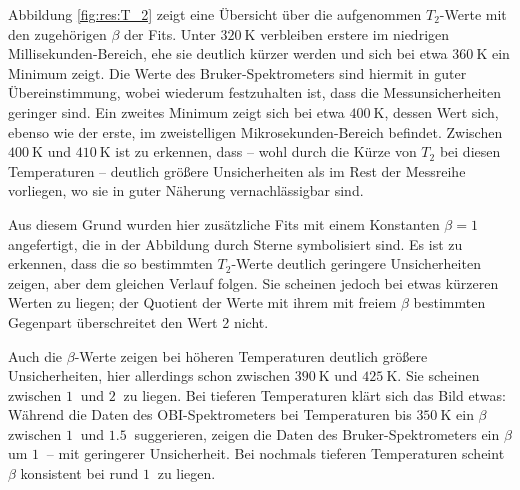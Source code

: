 Abbildung \ref{fig:res:T_2} zeigt eine Übersicht über die aufgenommen $T_2$-Werte mit den zugehörigen $\beta$ der Fits. Unter $\SI{320}{\kelvin}$ verbleiben erstere im niedrigen Millisekunden-Bereich, ehe sie deutlich kürzer werden und sich bei etwa $\SI{360}{\kelvin}$ ein Minimum zeigt. Die Werte des Bruker-Spektrometers sind hiermit in guter Übereinstimmung, wobei wiederum festzuhalten ist, dass die Messunsicherheiten geringer sind. Ein zweites Minimum zeigt sich bei etwa $\SI{400}{\kelvin}$, dessen Wert sich, ebenso wie der erste, im zweistelligen Mikrosekunden-Bereich befindet. Zwischen $\SI{400}{\kelvin}$ und $\SI{410}{\kelvin}$ ist zu erkennen, dass -- wohl durch die Kürze von $T_2$ bei diesen Temperaturen -- deutlich größere Unsicherheiten als im Rest der Messreihe vorliegen, wo sie in guter Näherung vernachlässigbar sind.

Aus diesem Grund wurden hier zusätzliche Fits mit einem Konstanten $\beta = 1$ angefertigt, die in der Abbildung durch Sterne symbolisiert sind. Es ist zu erkennen, dass die so bestimmten $T_2$-Werte deutlich geringere Unsicherheiten zeigen, aber dem gleichen Verlauf folgen. Sie scheinen jedoch bei etwas kürzeren Werten zu liegen; der Quotient der Werte mit ihrem mit freiem $\beta$ bestimmten Gegenpart überschreitet den Wert 2 nicht.

Auch die $\beta$-Werte zeigen bei höheren Temperaturen deutlich größere Unsicherheiten, hier allerdings schon zwischen $\SI{390}{\kelvin}$ und $\SI{425}{\kelvin}$. Sie scheinen zwischen $\SI{1}{}$ und $\SI{2}{}$ zu liegen. Bei tieferen Temperaturen klärt sich das Bild etwas: Während die Daten des OBI-Spektrometers bei Temperaturen bis $\SI{350}{\kelvin}$ ein $\beta$ zwischen $\SI{1}{}$ und $\SI{1.5}{}$ suggerieren, zeigen die Daten des Bruker-Spektrometers ein $\beta$ um $\SI{1}{}$ -- mit geringerer Unsicherheit. Bei nochmals tieferen Temperaturen scheint $\beta$ konsistent bei rund $\SI{1}{}$ zu liegen.

